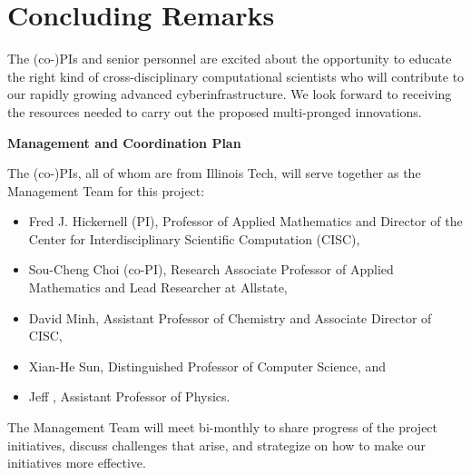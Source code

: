 \documentclass[11pt]{NSFamsart}
\begin{document}
\section{Concluding Remarks} 
The (co-)PIs and senior personnel are excited about the opportunity to educate the right kind of cross-disciplinary computational scientists who will contribute to our rapidly growing advanced cyberinfrastructure.  We look forward to receiving the resources needed to carry out the proposed multi-pronged innovations.


\newpage \setcounter{page}{1} %





{\renewcommand\addcontentsline[3]{} 
\renewcommand{\refname}{{\Large\textbf{References Cited}}}                  %
\renewcommand{\bibliofont}{\normalsize}

\hypertarget{Refer}{}}

\newpage \setcounter{page}{1} %

\centerline{\textbf{\Large Management and Coordination Plan}}
\hypertarget{Manage}{}



\bigskip

The (co-)PIs, all of whom are from Illinois Tech, will serve together as the Management Team for this project:
\begin{itemize}
\item Fred J. Hickernell (PI), Professor of Applied Mathematics and Director of the Center for Interdisciplinary Scientific Computation (CISC), 
\item Sou-Cheng Choi (co-PI), Research Associate Professor of Applied Mathematics and Lead Researcher at Allstate,
\item David Minh, Assistant Professor of Chemistry and Associate Director of CISC,
\item Xian-He Sun, Distinguished Professor of Computer Science, and 
\item Jeff \JW, Assistant Professor of Physics. 
\end{itemize}
The Management Team will meet bi-monthly to share progress of the project initiatives, discuss challenges that arise, and strategize on how to make our initiatives more effective.
\end{document}
